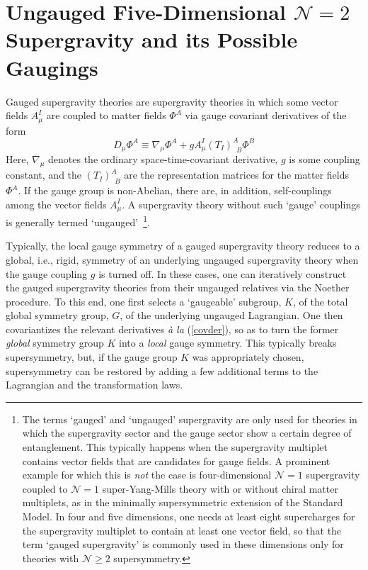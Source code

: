 \documentclass[a4paper,11pt]{article}
\begin{document}
\section{Ungauged Five-Dimensional $\mathcal{N}=2$ Supergravity and its
Possible Gaugings}
\setcounter{equation}{0}

Gauged supergravity theories
are  supergravity theories in which some vector fields $A_{\mu}^I$
are coupled to matter fields $\Phi^{A}$ via gauge
covariant derivatives of the form
\begin{equation}\label{covder}
D_{\mu}\Phi^A\equiv \nabla_\mu\Phi^A + g A_{\mu}^I
(T_I)^A_{\,\,\,B}\Phi^B
\end{equation}
Here, $\nabla_{\mu}$ denotes the ordinary space-time-covariant derivative,
$g$ is some coupling constant, and the $(T_I)^A_{\,\,\,B}$ are the
representation matrices for the matter fields $\Phi^A$. If the gauge group
is non-Abelian, there are, in addition, self-couplings among the vector
fields $A_{\mu}^I$.  A supergravity theory without such `gauge' couplings
is generally termed `ungauged'~\footnote{The terms `gauged' and `ungauged'
supergravity are only used for theories in which the supergravity sector
and the gauge sector show a certain degree of entanglement. This typically
happens when the supergravity multiplet contains vector fields that are
candidates for gauge fields. A prominent example for which this is
\emph{not} the case is four-dimensional $\mathcal{N}=1$ supergravity
coupled to $\mathcal{N}=1$ super-Yang-Mills theory with or without chiral
matter multiplets, as in the minimally supersymmetric extension of the
Standard Model. In four and five dimensions, one needs at least eight
supercharges for the supergravity multiplet to contain at least one vector
field, so that the term `gauged supergravity' is commonly used in these
dimensions only for theories with $\mathcal{N}\geq 2$ supersymmetry.}. 


Typically, the local gauge symmetry of a gauged supergravity theory
reduces to a global, i.e., rigid, symmetry of an underlying ungauged
supergravity theory when the gauge coupling $g$ is turned off. In these
cases, one can iteratively construct the gauged supergravity theories from
their ungauged relatives via the Noether procedure. To this end, one first
selects a `gaugeable' subgroup, $K$, of the total global symmetry group,
$G$, of the underlying ungauged Lagrangian. One then covariantizes the
relevant derivatives {\it \`{a} la} (\ref{covder}), so as to turn the
former \emph{global} symmetry group $K$ into a \emph{local} gauge
symmetry. This typically breaks supersymmetry, but, if the gauge group $K$
was appropriately chosen, supersymmetry can be restored by adding a few
additional terms to the Lagrangian and the transformation laws. 
\end{document}
